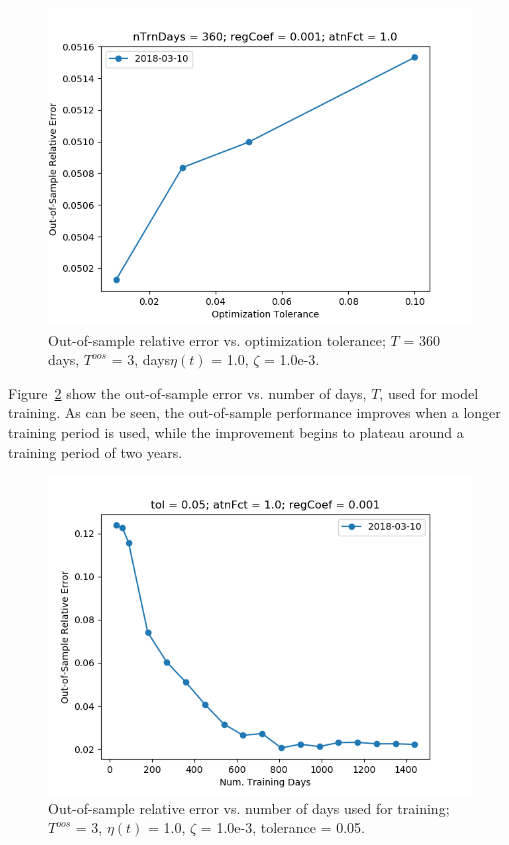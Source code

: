 \documentclass{article}
\begin{document}
\begin{figure}\label{fig:tolerance-sensitivity-oos-error}
\includegraphics[bb=0 0 640 480]{figures/tolerance-sensitivity-oos-error.png}
\caption{Out-of-sample relative error vs. optimization tolerance; $T$
  = 360 days, $T^{oos}$ = 3, days$\eta(t)$ = 1.0, $\zeta$ = 1.0e-3.}
\end{figure}

Figure~\ref{fig:nTrnDays-sensitivity-oos-error} show the out-of-sample
error vs. number of days, $T$, used for model training. As can be
seen, the out-of-sample performance improves when a longer training
period is used, while the improvement begins to plateau around a
training period of two years. 

\begin{figure}\label{fig:nTrnDays-sensitivity-oos-error}
\includegraphics[bb=0 0 640 480]{figures/nTrnDays-sensitivity-oos-error.png}
\caption{Out-of-sample relative error vs. number of days used for
  training; $T^{oos}$ = 3, $\eta(t)$ = 1.0, $\zeta$ = 1.0e-3,
  tolerance = 0.05.}
\end{figure}
\end{document}
